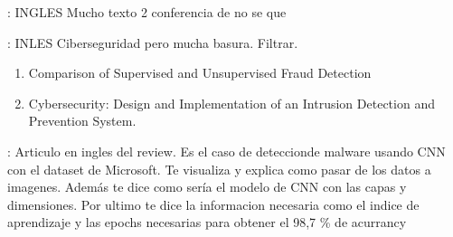 \documentclass[11pt, a4paper]{article} %
\begin{document}
\citep{xu2023machine} : INGLES Mucho texto 2 conferencia de no se que

\citep{alfaries2019advances} : INLES Ciberseguridad pero mucha basura. Filtrar.
\begin{enumerate}
\item Comparison of Supervised and Unsupervised Fraud Detection 
\item Cybersecurity: Design and Implementation of an Intrusion Detection
and Prevention System.
\end{enumerate}


\citep{kalash2018malware} : Articulo en ingles del review. Es el caso de deteccionde malware usando CNN con el dataset de Microsoft. Te visualiza y explica como pasar de los datos a imagenes. Además te dice como sería el modelo de CNN con las capas y dimensiones. Por ultimo te dice la informacion necesaria como el indice de aprendizaje y las epochs necesarias para obtener el 98,7 \% de acurrancy









\end{document}
